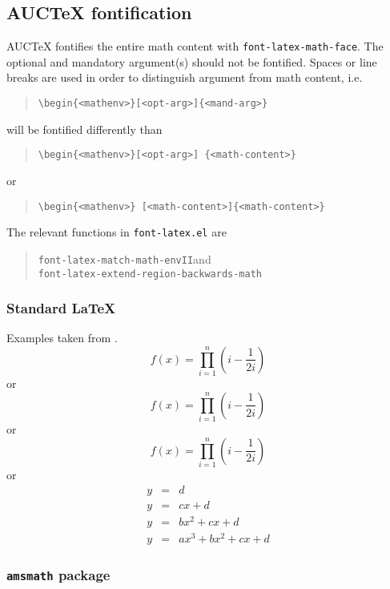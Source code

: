 \documentclass[a4paper]{article}
\begin{document}
\subsection{AUC\protect\TeX{} fontification}

AUC\TeX{} fontifies the entire math content with
\texttt{font-latex-math-face}.  The optional and mandatory argument(s)
should not be fontified.  Spaces or line breaks are used in order to
distinguish argument from math content, i.e.
\begin{quote}
\verb|\begin{<mathenv>}[<opt-arg>]{<mand-arg>}|
\end{quote}
will be fontified differently than
\begin{quote}
\verb|\begin{<mathenv>}[<opt-arg>] {<math-content>}|
\end{quote}
or
\begin{quote}
\verb|\begin{<mathenv>} [<math-content>]{<math-content>}|
\end{quote}

The relevant functions in \verb|font-latex.el| are
\begin{quote}
\verb|font-latex-match-math-envII|\quad and \\
\verb|font-latex-extend-region-backwards-math|
\end{quote}

\subsubsection{Standard \protect\LaTeX{}}

Examples taken from \cite{voss16}.
\begin{equation}
f(x)=\prod_{i=1}^{n}\left(i-\frac{1}{2i}\right)
\end{equation}
or
\begin{displaymath}
f(x)=\prod_{i=1}^{n}\left(i-\frac{1}{2i}\right)
\end{displaymath}
or
\[ f(x)=\prod_{i=1}^{n}\left(i-\frac{1}{2i}\right) \]
or
\begin{eqnarray*}
  y & = & d\\
  y & = & cx+d\\
  y & = & bx^{2}+cx+d\\
  y & = & ax^{3}+bx^{2}+cx+d
\end{eqnarray*}

\subsubsection{\texttt{amsmath} package}
\end{document}
